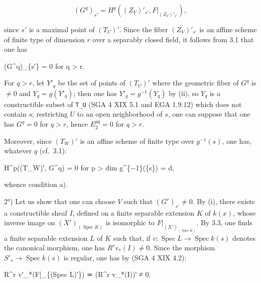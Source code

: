 \documentclass[
]{article}
\newenvironment{Shaded}{}{}
\newcommand{\NormalTok}[1]{#1}
\begin{document}
\[
(G^{q})_{s'} = H^{q}((Z_{V})'_{s'}, F|_{(Z_{V})'_{s'}}),
\]

since \(s'\) is a maximal point of \((T_{U})'\). Since the fiber
\((Z_{V})'_{s'}\) is an affine scheme of finite type of dimension \(r\)
over a separably closed field, it follows from 3.1 that one has

\begin{Shaded}
\begin{Highlighting}[]
\NormalTok{(G\^{}q)\_\{s′\} = 0 for q \textgreater{} r.}
\end{Highlighting}
\end{Shaded}

For \(q > r\), let \(Y'_{q}\) be the set of points of \((T_{U})'\) where
the geometric fiber of \(G^{q}\) is \(\neq 0\) and
\(Y_{q} = g(Y'_{q})\); then one has \(Y'_{q} = g^{-1}(Y_{q})\) by (ii),
so \(Y_{q}\) is a constructible subset of \texttt{T\_U} (SGA 4 XIX 5.1
and EGA 1.9.12) which does not contain \(s\); restricting \(U\) to an
open neighborhood of \(s\), one can suppose that one has \(G^{q} = 0\)
for \(q > r\), hence \(E^{pq}_{2} = 0\) for \(q > r\).

Moreover, since \((T_{W})'\) is an affine scheme of finite type over
\(g^{-1}({s})\), one has, whatever \(q\) (cf.~3.1):

\begin{Shaded}
\begin{Highlighting}[]
\NormalTok{H\^{}p((T\_W)′, G\^{}q) = 0 for p \textgreater{} dim g\^{}\{−1\}(\{s\}) = d,}
\end{Highlighting}
\end{Shaded}

whence condition a).

2°) Let us show that one can choose \(V\) such that
\((G^{r})_{s'} \neq 0\). By (i), there exists a constructible sheaf
\(I\), defined on a finite separable extension \(K\) of \(k(x)\), whose
inverse image on \((X')_{(\operatorname{Spec} K)}\) is isomorphic to
\(F|_{(X')_{(\operatorname{Spec} K)}}\). By 3.3, one finds a finite
separable extension \(L\) of \(K\) such that, if
\(v : \operatorname{Spec} L \to \operatorname{Spec} k(s)\) denotes the
canonical morphism, one has \(R^{r} v_{*}(I) \neq 0\). Since the
morphism \(S'_{s} \to \operatorname{Spec} k(s)\) is regular, one has by
(SGA 4 XIX 4.2):

\begin{Shaded}
\begin{Highlighting}[]
\NormalTok{R\^{}r v′\_*(F|\_\{(Spec L)′\}) ≃ (R\^{}r v\_*(I))′ ≠ 0.}
\end{Highlighting}
\end{Shaded}
\end{document}
